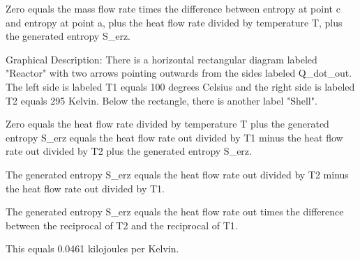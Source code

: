 Zero equals the mass flow rate times the difference between entropy at point c and entropy at point a, plus the heat flow rate divided by temperature T, plus the generated entropy S_erz.

Graphical Description:
There is a horizontal rectangular diagram labeled "Reactor" with two arrows pointing outwards from the sides labeled Q_dot_out. The left side is labeled T1 equals 100 degrees Celsius and the right side is labeled T2 equals 295 Kelvin. Below the rectangle, there is another label "Shell".

Zero equals the heat flow rate divided by temperature T plus the generated entropy S_erz equals the heat flow rate out divided by T1 minus the heat flow rate out divided by T2 plus the generated entropy S_erz.

The generated entropy S_erz equals the heat flow rate out divided by T2 minus the heat flow rate out divided by T1.

The generated entropy S_erz equals the heat flow rate out times the difference between the reciprocal of T2 and the reciprocal of T1.

This equals 0.0461 kilojoules per Kelvin.